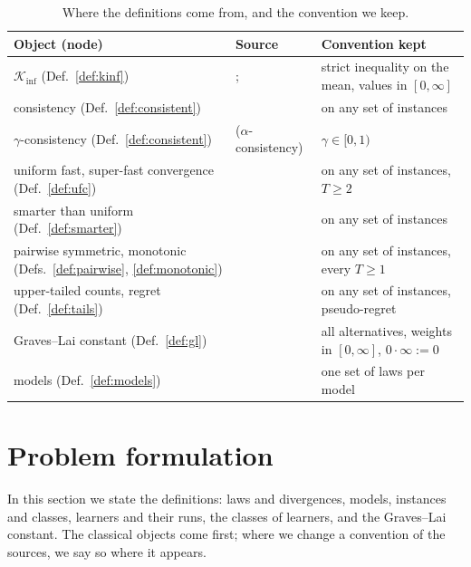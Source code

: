 \documentclass[11pt]{article}
\begin{document}
\begin{table}[t]
\centering
\caption{Where the definitions come from, and the convention we keep.}\label{tab:sources}
\small
\begin{tabular}{@{}p{}p{}p{}@{}}
\toprule
Object (node) & Source & Convention kept \\
\midrule
$\mathcal K_{\inf}$ (Def.~\ref{def:kinf}) & \citet[Section~1.2]{GMS19}; \citet[Theorem~16.2]{LS} & strict inequality on the mean, values in $[0,\infty]$ \\
consistency (Def.~\ref{def:consistent}) & \citet[Definition~16.1]{LS} & on any set of instances \\
$\gamma$-consistency (Def.~\ref{def:consistent}) & \citet[Definition~5]{SAE13} ($\alpha$-consistency) & $\gamma\in[0,1)$ \\
uniform fast, super-fast convergence (Def.~\ref{def:ufc}) & \citet[Definitions~1 and~6]{GMS19} & on any set of instances, $T\ge2$ \\
smarter than uniform (Def.~\ref{def:smarter}) & \citet[Definition~2]{GMS19} & on any set of instances \\
pairwise symmetric, monotonic (Defs.~\ref{def:pairwise}, \ref{def:monotonic}) & \citet[Definitions~3 and~4]{GMS19} & on any set of instances, every $T\ge1$ \\
upper-tailed counts, regret (Def.~\ref{def:tails}) & \citet[Definition~1]{SA11} & on any set of instances, pseudo-regret \\
Graves--Lai constant (Def.~\ref{def:gl}) & \citet[Theorem~1]{CMP17} & all alternatives, weights in $[0,\infty]$, $0\cdot\infty:=0$ \\
models (Def.~\ref{def:models}) & \citet{CGMMS13,HT15,AJK21,L17,HT14} & one set of laws per model \\
\bottomrule
\end{tabular}
\end{table}

\section{Problem formulation}\label{sec:setting}

In this section we state the definitions: laws and divergences, models, instances and classes,
learners and their runs, the classes of learners, and the Graves--Lai constant. The classical
objects come first; where we change a convention of the sources, we say so where it appears.
\end{document}

